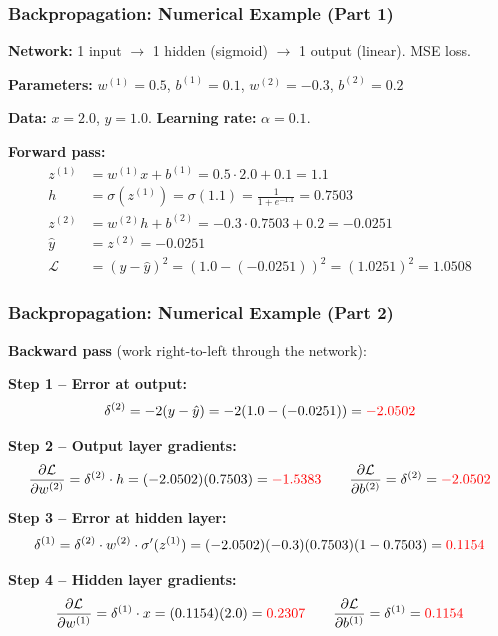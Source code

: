 \documentclass[notes,11pt, aspectratio=169]{beamer}
\newcommand{\pd}[2]{\frac{\partial #1}{\partial #2}}
\begin{document}
\begin{frame}
\frametitle{Backpropagation: Numerical Example (Part 1)}

\textbf{Network:} 1 input $\to$ 1 hidden (sigmoid) $\to$ 1 output (linear). MSE loss.

\vspace{4pt}
\textbf{Parameters:} $w^{(1)} = 0.5$, $b^{(1)} = 0.1$, $w^{(2)} = -0.3$, $b^{(2)} = 0.2$

\textbf{Data:} $x = 2.0$, $y = 1.0$. \qquad \textbf{Learning rate:} $\alpha = 0.1$.

\vspace{8pt}
\textbf{Forward pass:}
\begin{align*}
    z^{(1)} &= w^{(1)} x + b^{(1)} = 0.5 \cdot 2.0 + 0.1 = 1.1 \\[4pt]
    h &= \sigma(z^{(1)}) = \sigma(1.1) = \frac{1}{1 + e^{-1.1}} = 0.7503 \\[4pt]
    z^{(2)} &= w^{(2)} h + b^{(2)} = -0.3 \cdot 0.7503 + 0.2 = -0.0251 \\[4pt]
    \hat{y} &= z^{(2)} = -0.0251 \\[4pt]
    \mathcal{L} &= (y - \hat{y})^2 = (1.0 - (-0.0251))^2 = (1.0251)^2 = 1.0508
\end{align*}
\end{frame}

\begin{frame}
\frametitle{Backpropagation: Numerical Example (Part 2)}

\textbf{Backward pass} (work right-to-left through the network):

\vspace{2pt}
\textbf{Step 1 -- Error at output:}
\[
    \delta^{(2)} = -2(y - \hat{y}) = -2(1.0 - (-0.0251)) = \textcolor{red}{-2.0502}
\]

\textbf{Step 2 -- Output layer gradients:}
\[
    \pd{\mathcal{L}}{w^{(2)}} = \delta^{(2)} \cdot h = (-2.0502)(0.7503) = \textcolor{red}{-1.5383}
    \qquad
    \pd{\mathcal{L}}{b^{(2)}} = \delta^{(2)} = \textcolor{red}{-2.0502}
\]

\textbf{Step 3 -- Error at hidden layer:}
\[
    \delta^{(1)} = \delta^{(2)} \cdot w^{(2)} \cdot \sigma'(z^{(1)}) = (-2.0502)(-0.3)(0.7503)(1 - 0.7503) = \textcolor{red}{0.1154}
\]

\textbf{Step 4 -- Hidden layer gradients:}
\[
    \pd{\mathcal{L}}{w^{(1)}} = \delta^{(1)} \cdot x = (0.1154)(2.0) = \textcolor{red}{0.2307}
    \qquad
    \pd{\mathcal{L}}{b^{(1)}} = \delta^{(1)} = \textcolor{red}{0.1154}
\]
\end{frame}
\end{document}
